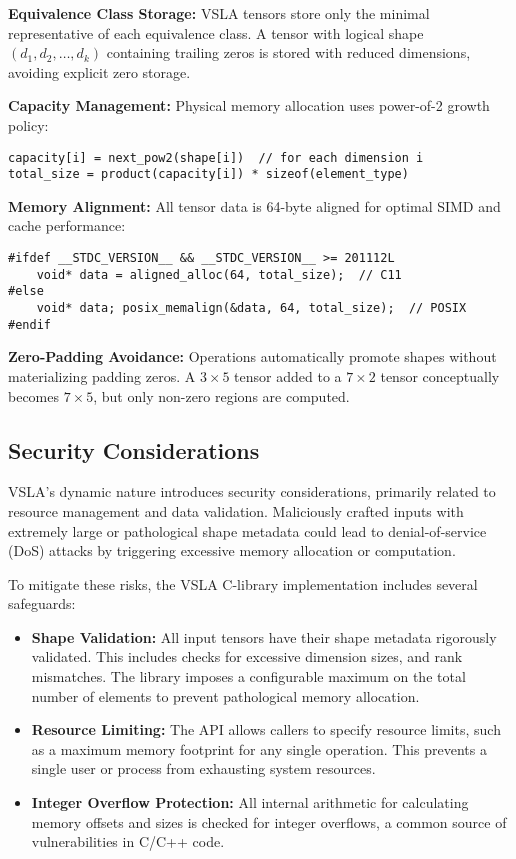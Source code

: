 \begin{tcolorbox}[colback=memory,colframe=red!50!black,title=Memory Layout and Optimization]
\textbf{Equivalence Class Storage:} VSLA tensors store only the minimal representative of each equivalence class. A tensor with logical shape $(d_1, d_2, \ldots, d_k)$ containing trailing zeros is stored with reduced dimensions, avoiding explicit zero storage.

\textbf{Capacity Management:} Physical memory allocation uses power-of-2 growth policy:
\begin{verbatim}
capacity[i] = next_pow2(shape[i])  // for each dimension i
total_size = product(capacity[i]) * sizeof(element_type)  
\end{verbatim}

\textbf{Memory Alignment:} All tensor data is 64-byte aligned for optimal SIMD and cache performance:
\begin{verbatim}
#ifdef __STDC_VERSION__ && __STDC_VERSION__ >= 201112L
    void* data = aligned_alloc(64, total_size);  // C11
#else
    void* data; posix_memalign(&data, 64, total_size);  // POSIX
#endif
\end{verbatim}

\textbf{Zero-Padding Avoidance:} Operations automatically promote shapes without materializing padding zeros. A $3 \times 5$ tensor added to a $7 \times 2$ tensor conceptually becomes $7 \times 5$, but only non-zero regions are computed.
\end{tcolorbox}

\subsection{Security Considerations}
VSLA's dynamic nature introduces security considerations, primarily related to resource management and data validation. Maliciously crafted inputs with extremely large or pathological shape metadata could lead to denial-of-service (DoS) attacks by triggering excessive memory allocation or computation.

To mitigate these risks, the VSLA C-library implementation includes several safeguards:
\begin{itemize}
    \item \textbf{Shape Validation:} All input tensors have their shape metadata rigorously validated. This includes checks for excessive dimension sizes, and rank mismatches. The library imposes a configurable maximum on the total number of elements to prevent pathological memory allocation.
    \item \textbf{Resource Limiting:} The API allows callers to specify resource limits, such as a maximum memory footprint for any single operation. This prevents a single user or process from exhausting system resources.
    \item \textbf{Integer Overflow Protection:} All internal arithmetic for calculating memory offsets and sizes is checked for integer overflows, a common source of vulnerabilities in C/C++ code.
\end{itemize}

